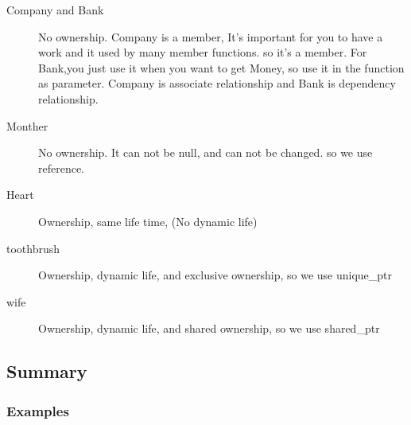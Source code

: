 \documentclass[a4paper,11pt,twoside]{book}
\begin{document}
\begin{itemize}
\begin{enumerate}
\begin{description}
	\item[Company and Bank] No ownership. Company is a member, It's important for you to have a work and it used by many member functions. so it's a member. For Bank,you just use it when you want to get Money, so use it in the function as parameter. Company is associate relationship and Bank is dependency relationship.
	
	\item[Monther] No ownership. It can not be null, and can not be changed.  so we use reference. 
	
	\item[Heart] Ownership, same life time, (No dynamic life)
	
	\item [toothbrush] Ownership, dynamic life, and exclusive ownership, so we use unique\_ptr
	
	\item [wife] Ownership, dynamic life, and shared ownership, so we use shared\_ptr
\end{description}

\end{enumerate}


	
\end{itemize}
\subsection{Summary}

\subsubsection{Examples}
\end{document}
